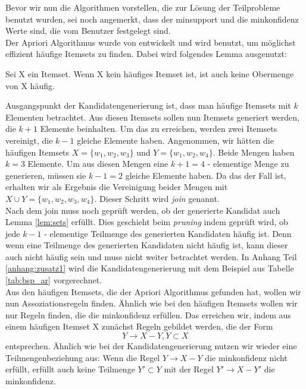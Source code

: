 Bevor wir nun die Algorithmen vorstellen, die zur Lösung der Teilprobleme benutzt wurden, sei noch angemerkt, dass der minsupport und die minkonfidenz Werte sind, die vom Benutzer festgelegt sind.
\\
Der Apriori Algorithmus wurde von \citet{AgImSw93} entwickelt und wird benutzt, um möglichst effizient häufige Itemsets zu finden. Dabei wird folgendes Lemma ausgenutzt:
\begin{lemma}
	Sei X ein Itemset. Wenn X kein häufiges Itemset ist, ist auch keine Obermenge von X häufig. \citep{AgImSw93}
	\label{lem:sets}
\end{lemma}
Ausgangspunkt der Kandidatengenerierung ist, dass man häufige Itemsets mit $k$ Elementen betrachtet. Aus diesen Itemsets sollen nun Itemsets generiert werden, die $k+1$ Elemente beinhalten. Um das zu erreichen, werden zwei Itemsets vereinigt, die $k-1$ gleiche Elemente haben. Angenommen, wir hätten die häufigen Itemsets $X = \{w_1, w_2, w_3\}$ und $Y = \{w_1, w_2, w_4\}$. Beide Mengen haben $k=3$ Elemente. Um aus diesen Mengen eine $k+1=4$ - elementige Menge zu generieren, müssen sie $k-1=2$ gleiche Elemente haben. Da das der Fall ist, erhalten wir als Ergebnis die Vereinigung beider Mengen mit $X \cup Y = \{w_1, w_2, w_3, w_4\}$. Dieser Schritt wird \textit{join} genannt.\\
Nach dem join muss noch geprüft werden, ob der generierte Kandidat auch Lemma \ref{lem:sets} erfüllt. Dies geschieht beim \textit{pruning} indem geprüft wird, ob jede $k-1$ - elementige Teilmenge des generierten Kandidaten häufig ist. Denn wenn eine Teilmenge des generierten Kandidaten nicht häufig ist, kann dieser auch nicht häufig sein und muss nicht weiter betrachtet werden. In Anhang Teil \ref{anhang:zusatz1} wird die Kandidatengenerierung mit dem Beispiel aus Tabelle \ref{tab:bsp_ar} vorgerechnet.
\\
Aus den häufigen Itemsets, die der Apriori Algorithmus gefunden hat, wollen wir nun Assoziationsregeln finden. Ähnlich wie bei den häufigen Itemsets wollen wir nur Regeln finden, die die minkonfidenz erfüllen. Das erreichen wir, indem aus einem häufigen Itemset X zunächst Regeln gebildet werden, die der Form 
\begin{equation*}
Y \rightarrow X - Y, Y \subset X
\end{equation*}
entsprechen. Ähnlich wie bei der Kandidatengenerierung nutzen wir wieder eine Teilmengenbeziehung aus: Wenn die Regel $Y \rightarrow X - Y$ die minkonfidenz nicht erfüllt, erfüllt auch keine Teilmenge $Y' \subset Y$ mit der Regel $Y' \rightarrow X - Y'$ die minkonfidenz.

\clearpage
